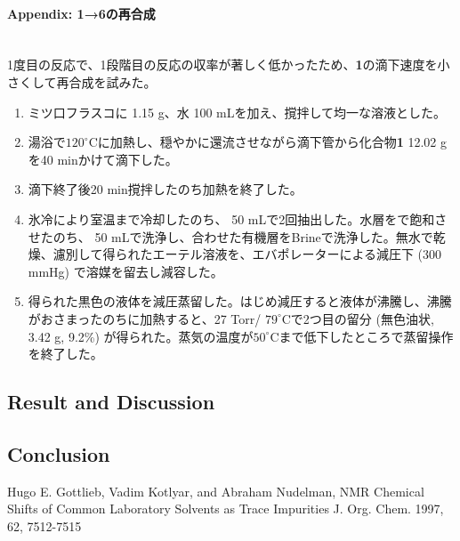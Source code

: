 \documentclass{ltjsarticle}
\theoremstyle{definition}
\numberwithin{equation}{section}
\newcommand{\D}{^\circ\text{C}}
\begin{document}
\paragraph{Appendix: \textbf{1}→\textbf{6}の再合成}\\
1度目の反応で、1段階目の反応の収率が著しく低かったため、\textbf{1}の滴下速度を小さくして再合成を試みた。
\begin{enumerate}
\item ミツ口フラスコに 1.15 g、水 100 mLを加え、撹拌して均一な溶液とした。
\item 湯浴で$120\D$に加熱し、穏やかに還流させながら滴下管から化合物\textbf{1} 12.02 gを40 minかけて滴下した。 
\item 滴下終了後20 min撹拌したのち加熱を終了した。
\item 氷冷により室温まで冷却したのち、 50 mLで2回抽出した。水層をで飽和させたのち、 50 mLで洗浄し、合わせた有機層をBrineで洗浄した。無水で乾燥、濾別して得られたエーテル溶液を、エバポレーターによる減圧下 (300 mmHg) で溶媒を留去し減容した。
\item 得られた黒色の液体を減圧蒸留した。はじめ減圧すると液体が沸騰し、沸騰がおさまったのちに加熱すると、27 Torr/ $79\D$で2つ目の留分 (無色油状, 3.42 g, 9.2\%) が得られた。蒸気の温度が$50\D$まで低下したところで蒸留操作を終了した。
\end{enumerate}

\subsection{Result and Discussion}

\subsection{Conclusion}

\begin{thebibliography}{99}
Hugo E. Gottlieb, Vadim Kotlyar, and
Abraham Nudelman, 
NMR Chemical Shifts of Common
Laboratory Solvents as Trace Impurities
J. Org. Chem. 1997, 62, 7512-7515
\end{thebibliography}
\end{document}
